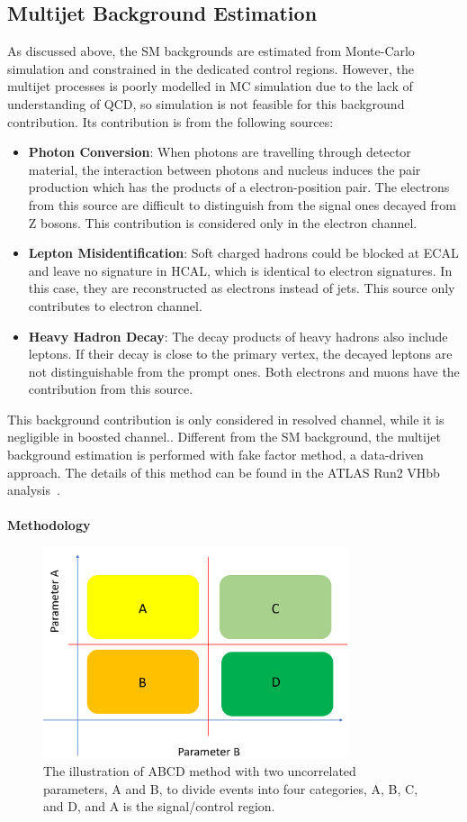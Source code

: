 \subsection{Multijet Background Estimation}
\label{sec:multijet_background}
As discussed above, the SM backgrounds are estimated from Monte-Carlo simulation and constrained in the dedicated control regions. However, the multijet processes is poorly modelled in MC simulation due to the lack of understanding of QCD, so simulation is not feasible for this background contribution. Its contribution is from the following sources:
\begin{itemize}
	\item {\bf Photon Conversion}: When photons are travelling through detector material, the interaction between photons and nucleus induces the pair production which has the products of a electron-position pair. The electrons from this source are difficult to distinguish from the signal ones decayed from Z bosons. This contribution is considered only in the electron channel.
	\item {\bf Lepton Misidentification}: Soft charged hadrons could be blocked at ECAL and leave no signature in HCAL, which is identical to electron signatures. In this case, they are reconstructed as electrons instead of jets. This source only contributes to electron channel.
	\item {\bf Heavy Hadron Decay}: The decay products of heavy hadrons also include leptons. If their decay is close to the primary vertex, the decayed leptons are not distinguishable from the prompt ones. Both electrons and muons have the contribution from this source. 
\end{itemize}
\noindent
This background contribution is only considered in resolved channel, while it is negligible in boosted channel.\cite{EXOT-2016-28}. Different from the SM background, the multijet background estimation is performed with fake factor method, a data-driven approach. The details of this method can be found in the ATLAS Run2 VHbb analysis~\cite{ATLAS-CONF-2016-091, ATL-COM-PHYS-2016-429}. 
\\
\\{\bf Methodology}
\begin{figure}[ht]
	\centering
	\includegraphics[width=0.8\textwidth]{Chapter3/ABCD.png}
	\caption{The illustration of ABCD method with two uncorrelated parameters, A and B, to divide events into four categories, A, B, C, and D, and A is the signal/control region.}
	\label{Fig:ABCD}
\end{figure}
